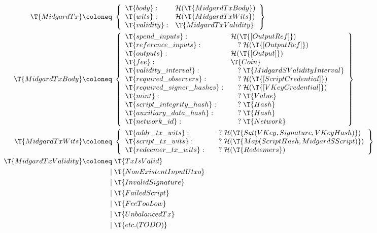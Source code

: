 \documentclass[../midgard.tex]{subfiles}
\begin{document}
\begingroup
\allowdisplaybreaks
\begin{align*}
    \T{MidgardTx} \coloneq\;& \left\{
    \begin{array}{ll}
        \T{body} : & \mathcal{H}(\T{MidgardTxBody}) \\
        \T{wits} : & \mathcal{H}(\T{MidgardTxWits}) \\
        \T{validity} : & \T{MidgardTxValidity} \\
    \end{array} \right\} \\
    \T{MidgardTxBody} \coloneq\;& \left\{
    \begin{array}{ll}
        \T{spend\_inputs} : & \mathcal{H}(\T{[OutputRef]}) \\
        \T{reference\_inputs} : & \quad?\;\mathcal{H}(\T{[OutputRef]}) \\
        \T{outputs} : & \mathcal{H}(\T{[Output]}) \\
        \T{fee} : & \T{Coin} \\
        \T{validity\_interval} : & \quad?\;\T{MidgardSValidityInterval} \\
        \T{required\_observers} : & \quad?\;\mathcal{H}(\T{[ScriptCredential]}) \\
        \T{required\_signer\_hashes} : & \quad?\;\mathcal{H}(\T{[VKeyCredential]}) \\
        \T{mint} : & \quad?\;\T{Value} \\
        \T{script\_integrity\_hash} : & \quad?\;\T{Hash} \\
        \T{auxiliary\_data\_hash} : & \quad?\;\T{Hash} \\
        \T{network\_id} : & \quad?\;\T{Network}
    \end{array} \right\}\\
    \T{MidgardTxWits} \coloneq\;& \left\{
    \begin{array}{ll}
        \T{addr\_tx\_wits} : & \quad?\;\mathcal{H}(\T{Set(VKey, Signature, VKeyHash)}) \\
        \T{script\_tx\_wits} : & \quad?\;\mathcal{H}(\T{Map(ScriptHash, MidgardSScript)}) \\
        \T{redeemer\_tx\_wits} : & \quad?\;\mathcal{H}(\T{Redeemers})
    \end{array} \right\}\\
    \T{MidgardTxValidity} \coloneq\;& \T{TxIsValid} \\
                              \mid\;& \T{NonExistentInputUtxo} \\
                              \mid\;& \T{InvalidSignature} \\
                              \mid\;& \T{FailedScript} \\
                              \mid\;& \T{FeeTooLow} \\
                              \mid\;& \T{UnbalancedTx} \\
                              \mid\;& \T{etc. (TODO)}
\end{align*}
\endgroup
\end{document}
